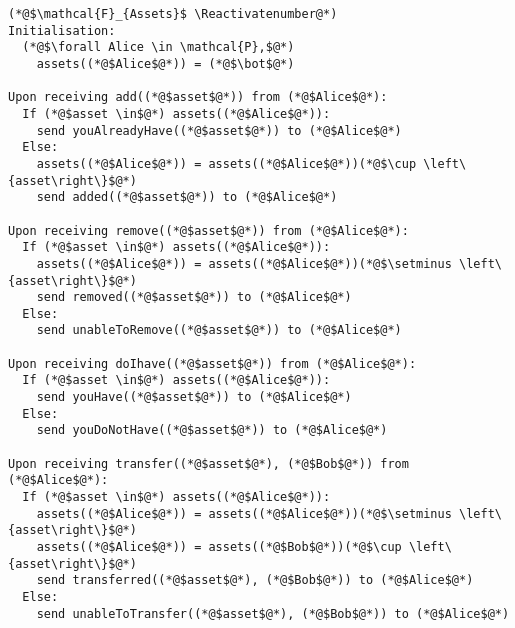 \Suppressnumber
\begin{lstlisting}[label=assetsfunc, style=numbers]
(*@$\mathcal{F}_{Assets}$ \Reactivatenumber@*)
Initialisation:
  (*@$\forall Alice \in \mathcal{P},$@*)
    assets((*@$Alice$@*)) = (*@$\bot$@*)

Upon receiving add((*@$asset$@*)) from (*@$Alice$@*):
  If (*@$asset \in$@*) assets((*@$Alice$@*)):
    send youAlreadyHave((*@$asset$@*)) to (*@$Alice$@*)
  Else:
    assets((*@$Alice$@*)) = assets((*@$Alice$@*))(*@$\cup \left\{asset\right\}$@*)
    send added((*@$asset$@*)) to (*@$Alice$@*)

Upon receiving remove((*@$asset$@*)) from (*@$Alice$@*):
  If (*@$asset \in$@*) assets((*@$Alice$@*)):
    assets((*@$Alice$@*)) = assets((*@$Alice$@*))(*@$\setminus \left\{asset\right\}$@*)
    send removed((*@$asset$@*)) to (*@$Alice$@*)
  Else:
    send unableToRemove((*@$asset$@*)) to (*@$Alice$@*)

Upon receiving doIhave((*@$asset$@*)) from (*@$Alice$@*):
  If (*@$asset \in$@*) assets((*@$Alice$@*)):
    send youHave((*@$asset$@*)) to (*@$Alice$@*)
  Else:
    send youDoNotHave((*@$asset$@*)) to (*@$Alice$@*)

Upon receiving transfer((*@$asset$@*), (*@$Bob$@*)) from (*@$Alice$@*):
  If (*@$asset \in$@*) assets((*@$Alice$@*)):
    assets((*@$Alice$@*)) = assets((*@$Alice$@*))(*@$\setminus \left\{asset\right\}$@*)
    assets((*@$Alice$@*)) = assets((*@$Bob$@*))(*@$\cup \left\{asset\right\}$@*)
    send transferred((*@$asset$@*), (*@$Bob$@*)) to (*@$Alice$@*)
  Else:
    send unableToTransfer((*@$asset$@*), (*@$Bob$@*)) to (*@$Alice$@*)
\end{lstlisting}
